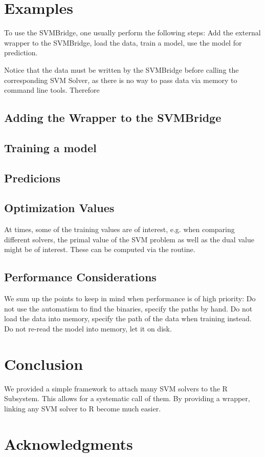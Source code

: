 \documentclass[article]{jss}
\begin{document}
\section{Examples}

To use the SVMBridge, one usually perform the following steps:
Add the external wrapper to the SVMBridge, load the data, train a model, use the
model for prediction.

Notice that the data must be written by the SVMBridge before calling 
the corresponding SVM Solver, as there is no way to pass data via memory
to command line tools. Therefore 

\subsection{Adding the Wrapper to the SVMBridge}

\subsection{Training a model}



\subsection{Predicions}


\subsection{Optimization Values}

At times, some of the training values are of interest,
e.g. when comparing different solvers, the primal value
of the SVM problem as well as the dual value might  be of interest.
These can be computed via the  routine.


\subsection{Performance Considerations}

We sum up the points to keep in mind when performance is of high priority:
Do not use the automatism to find the binaries, specify the paths by hand.
Do not load the data into memory, specify the path of the data when training instead.
Do not re-read the model into memory, let it on disk.


\section{Conclusion}

We provided a simple framework to attach many SVM solvers to the R Subsystem.
This allows for a systematic call of them.
By providing a wrapper, linking any SVM solver to R become much easier.

\section*{Acknowledgments}
\end{document}

